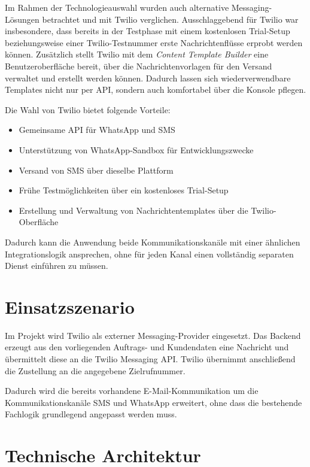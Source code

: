 \documentclass[12pt,a4paper]{article}
\begin{document}
Im Rahmen der Technologieauswahl wurden auch alternative
Messaging-Lösungen betrachtet und mit Twilio verglichen. Ausschlaggebend
für Twilio war insbesondere, dass bereits in der Testphase mit einem
kostenlosen Trial-Setup beziehungsweise einer Twilio-Testnummer erste
Nachrichtenflüsse erprobt werden können. Zusätzlich stellt Twilio mit
dem \emph{Content Template Builder} eine Benutzeroberfläche bereit, über
die Nachrichtenvorlagen für den Versand verwaltet und erstellt werden
können. Dadurch lassen sich wiederverwendbare Templates nicht nur per
API, sondern auch komfortabel über die Konsole pflegen.

Die Wahl von Twilio bietet folgende Vorteile:

\begin{itemize}
    \item Gemeinsame API für WhatsApp und SMS
    \item Unterstützung von WhatsApp-Sandbox für Entwicklungszwecke
    \item Versand von SMS über dieselbe Plattform
    \item Frühe Testmöglichkeiten über ein kostenloses Trial-Setup
    \item Erstellung und Verwaltung von Nachrichtentemplates über die Twilio-Oberfläche
\end{itemize}

Dadurch kann die Anwendung beide Kommunikationskanäle mit einer
ähnlichen Integrationslogik ansprechen, ohne für jeden Kanal einen
vollständig separaten Dienst einführen zu müssen.

\section{Einsatzszenario}

Im Projekt wird Twilio als externer Messaging-Provider eingesetzt.
Das Backend erzeugt aus den vorliegenden Auftrags- und Kundendaten eine
Nachricht und übermittelt diese an die Twilio Messaging API. Twilio
übernimmt anschließend die Zustellung an die angegebene Zielrufnummer.

Dadurch wird die bereits vorhandene E-Mail-Kommunikation um die
Kommunikationskanäle SMS und WhatsApp erweitert, ohne dass die
bestehende Fachlogik grundlegend angepasst werden muss.

\section{Technische Architektur}
\end{document}

